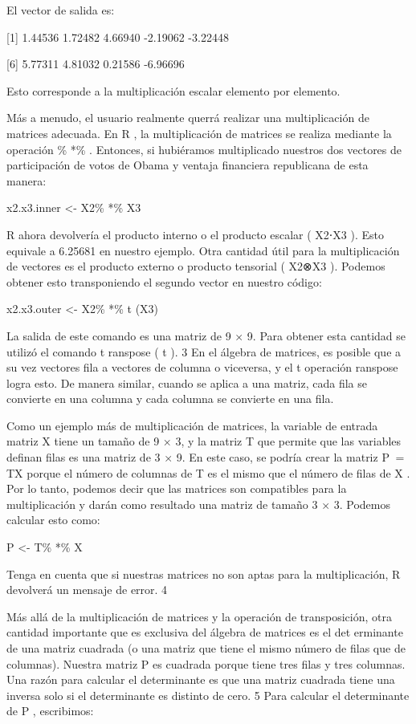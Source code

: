\documentclass[
]{book}
\begin{document}
El vector de salida es:

{[}1{]} 1.44536 1.72482 4.66940 -2.19062 -3.22448

{[}6{]} 5.77311 4.81032 0.21586 -6.96696

Esto corresponde a la multiplicación escalar elemento por elemento.

Más a menudo, el usuario realmente querrá realizar una multiplicación de matrices adecuada. En R , la multiplicación de matrices se realiza mediante la operación \% *\% . Entonces, si hubiéramos multiplicado nuestros dos vectores de participación de votos de Obama y ventaja financiera republicana de esta manera:

x2.x3.inner \textless- X2\% *\% X3

R ahora devolvería el producto interno o el producto escalar ( X2⋅X3 ). Esto equivale a 6.25681 en nuestro ejemplo. Otra cantidad útil para la multiplicación de vectores es el producto externo o producto tensorial ( X2⊗X3 ). Podemos obtener esto transponiendo el segundo vector en nuestro código:

x2.x3.outer \textless- X2\% *\% t (X3)

La salida de este comando es una matriz de 9 × 9. Para obtener esta cantidad se utilizó el comando t ranspose ( t ). 3 En el álgebra de matrices, es posible que a su vez vectores fila a vectores de columna o viceversa, y el t operación ranspose logra esto. De manera similar, cuando se aplica a una matriz, cada fila se convierte en una columna y cada columna se convierte en una fila.

Como un ejemplo más de multiplicación de matrices, la variable de entrada matriz X tiene un tamaño de 9 × 3, y la matriz T que permite que las variables definan filas es una matriz de 3 × 9. En este caso, se podría crear la matriz P  =  TX porque el número de columnas de T es el mismo que el número de filas de X . Por lo tanto, podemos decir que las matrices son compatibles para la multiplicación y darán como resultado una matriz de tamaño 3 × 3. Podemos calcular esto como:

P \textless- T\% *\% X

Tenga en cuenta que si nuestras matrices no son aptas para la multiplicación, R devolverá un mensaje de error. 4

Más allá de la multiplicación de matrices y la operación de transposición, otra cantidad importante que es exclusiva del álgebra de matrices es el det erminante de una matriz cuadrada (o una matriz que tiene el mismo número de filas que de columnas). Nuestra matriz P es cuadrada porque tiene tres filas y tres columnas. Una razón para calcular el determinante es que una matriz cuadrada tiene una inversa solo si el determinante es distinto de cero. 5 Para calcular el determinante de P , escribimos:
\end{document}
